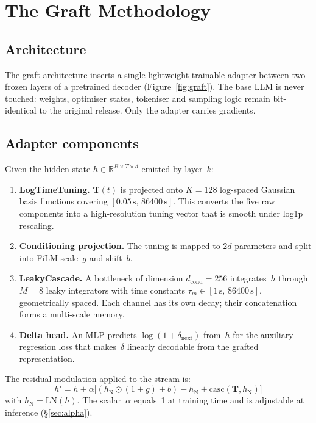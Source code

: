 \documentclass[10pt,twocolumn,letterpaper]{article}
\begin{document}
\section{The Graft Methodology}

\subsection{Architecture}

The graft architecture inserts a single lightweight trainable adapter between two frozen layers of a pretrained decoder (Figure~\ref{fig:graft}). The base LLM is never touched: weights, optimiser states, tokeniser and sampling logic remain bit-identical to the original release. Only the adapter carries gradients.

\subsection{Adapter components}

Given the hidden state $h \in \mathbb{R}^{B\times T\times d}$ emitted by layer~$k$:
\begin{enumerate}[leftmargin=0.6cm, itemsep=1pt]
    \item \textbf{LogTimeTuning.} $\mathbf{T}(t)$ is projected onto $K=128$ log-spaced Gaussian basis functions covering $[0.05\,\text{s},\,86400\,\text{s}]$. This converts the five raw components into a high-resolution tuning vector that is smooth under log1p rescaling.
    \item \textbf{Conditioning projection.} The tuning is mapped to $2d$ parameters and split into FiLM scale~$g$ and shift~$b$.
    \item \textbf{LeakyCascade.} A bottleneck of dimension $d_{\text{cond}}=256$ integrates~$h$ through $M=8$ leaky integrators with time constants $\tau_m \in [1\,\text{s},\,86400\,\text{s}]$, geometrically spaced. Each channel has its own decay; their concatenation forms a multi-scale memory.
    \item \textbf{Delta head.} An MLP predicts $\log(1+\delta_{\text{next}})$ from~$h$ for the auxiliary regression loss that makes~$\delta$ linearly decodable from the grafted representation.
\end{enumerate}

The residual modulation applied to the stream is:
\begin{equation}
h' = h + \alpha \bigl[(h_{\text{N}}\!\odot\!(1\!+\!g) + b) - h_{\text{N}} + \text{casc}(\mathbf{T},h_{\text{N}})\bigr]
\label{eq:modulation}
\end{equation}
with $h_{\text{N}} = \text{LN}(h)$. The scalar~$\alpha$ equals~1 at training time and is adjustable at inference (\S\ref{sec:alpha}).
\end{document}
